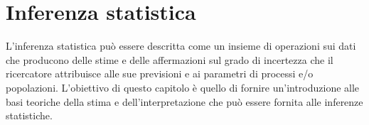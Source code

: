 \chapter{Inferenza statistica}
\label{chapter:stimatori}

L'inferenza statistica può essere descritta come un insieme di operazioni sui dati che producono delle stime e delle affermazioni sul grado di incertezza che il ricercatore attribuisce alle sue previsioni e ai parametri di  processi e/o popolazioni.
L'obiettivo di questo capitolo è quello di fornire un'introduzione alle basi teoriche della stima e dell'interpretazione che può essere fornita alle inferenze statistiche. 


%
%


